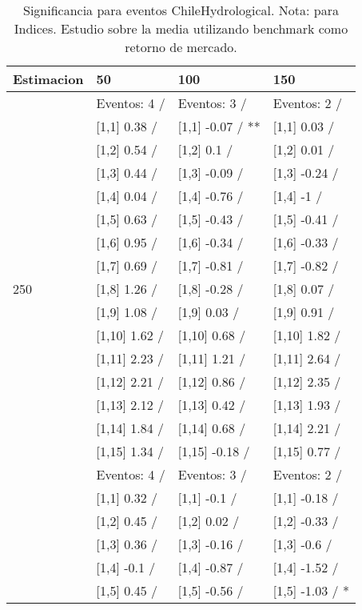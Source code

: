 \begin{table}

\caption{Significancia para eventos ChileHydrological. Nota: para Indices. Estudio sobre la media utilizando benchmark como retorno de mercado.}
\centering
\begin{tabular}[t]{llll}
\toprule
Estimacion & 50 & 100 & 150\\
\midrule
 & Eventos:  4 / & Eventos:  3 / & Eventos:  2 /\\
 & {}[1,1] 0.38  / & {}[1,1] -0.07  / ** & {}[1,1] 0.03  /\\
 & {}[1,2] 0.54  / & {}[1,2] 0.1  / & {}[1,2] 0.01  /\\
 & {}[1,3] 0.44  / & {}[1,3] -0.09  / & {}[1,3] -0.24  /\\
 & {}[1,4] 0.04  / & {}[1,4] -0.76  / & {}[1,4] -1  /\\
\addlinespace
 & {}[1,5] 0.63  / & {}[1,5] -0.43  / & {}[1,5] -0.41  /\\
 & {}[1,6] 0.95  / & {}[1,6] -0.34  / & {}[1,6] -0.33  /\\
 & {}[1,7] 0.69  / & {}[1,7] -0.81  / & {}[1,7] -0.82  /\\
250 & {}[1,8] 1.26  / & {}[1,8] -0.28  / & {}[1,8] 0.07  /\\
 & {}[1,9] 1.08  / & {}[1,9] 0.03  / & {}[1,9] 0.91  /\\
\addlinespace
 & {}[1,10] 1.62  / & {}[1,10] 0.68  / & {}[1,10] 1.82  /\\
 & {}[1,11] 2.23  / & {}[1,11] 1.21  / & {}[1,11] 2.64  /\\
 & {}[1,12] 2.21  / & {}[1,12] 0.86  / & {}[1,12] 2.35  /\\
 & {}[1,13] 2.12  / & {}[1,13] 0.42  / & {}[1,13] 1.93  /\\
 & {}[1,14] 1.84  / & {}[1,14] 0.68  / & {}[1,14] 2.21  /\\
\addlinespace
 & {}[1,15] 1.34  / & {}[1,15] -0.18  / & {}[1,15] 0.77  /\\
 & Eventos:  4 / & Eventos:  3 / & Eventos:  2 /\\
 & {}[1,1] 0.32  / & {}[1,1] -0.1  / & {}[1,1] -0.18  /\\
 & {}[1,2] 0.45  / & {}[1,2] 0.02  / & {}[1,2] -0.33  /\\
 & {}[1,3] 0.36  / & {}[1,3] -0.16  / & {}[1,3] -0.6  /\\
\addlinespace
 & {}[1,4] -0.1  / & {}[1,4] -0.87  / & {}[1,4] -1.52  /\\
 & {}[1,5] 0.45  / & {}[1,5] -0.56  / & {}[1,5] -1.03  / *\\

\end{tabular}
\end{table}
